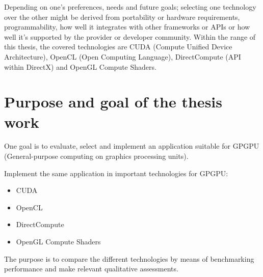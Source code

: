 Depending on one's preferences, needs and future goals; selecting one technology over the other might be derived from portability or hardware requirements, programmability, how well it integrates with other frameworks or APIs or how well it's supported by the provider or developer community. Within the range of this thesis, the covered technologies are CUDA (Compute Unified Device Architecture), OpenCL (Open Computing Language), DirectCompute (API within DirectX) and OpenGL Compute Shaders.

\section{Purpose and goal of the thesis work}
One goal is to evaluate, select and implement an application suitable for GPGPU (General-purpose computing on graphics processing units).

Implement the same application in important technologies for GPGPU:
\begin{itemize}
	\item CUDA
	\item OpenCL
	\item DirectCompute
	\item OpenGL Compute Shaders
\end{itemize}

The purpose is to compare the different technologies by means of benchmarking performance and make relevant qualitative assessments.